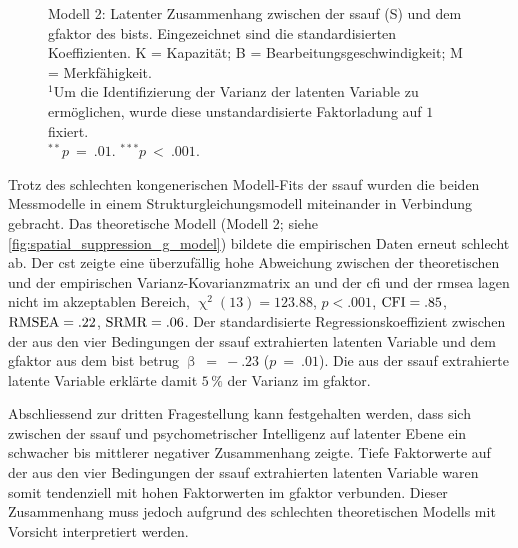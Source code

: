 \documentclass[11pt, twoside, a4paper]{book}		%
\begin{document}
\begin{figure}[htbp]
	
	\vspace{.2cm}
	\caption[Modell 2: Strukturgleichungsmodell zur Vorhersage des \gls{gfaktor}s durch die \gls{ssauf}]{Modell 2: Latenter Zusammenhang zwischen der \gls{ssauf} (\textsf{S}) und dem \gls{gfaktor} des \gls{bist}s. Eingezeichnet sind die standardisierten Koeffizienten. \textsf{K} = Kapazität; \textsf{B} = Bearbeitungsgeschwindigkeit; \textsf{M} = Merkfähigkeit.\\
	$^1$Um die Identifizierung der Varianz der latenten Variable zu ermöglichen, wurde diese unstandardisierte Faktorladung auf $1$ fixiert.\\
	$^{**}p~=~.01$. $^{***}p~<~.001$.}
	\label{fig:spatial_suppression_g_model}
\end{figure} 

Trotz des schlechten kongenerischen Modell-Fits der \gls{ssauf} wurden die beiden Messmodelle in einem Strukturgleichungsmodell miteinander in Verbindung gebracht. Das theoretische Modell (Modell 2; siehe \autoref{fig:spatial_suppression_g_model}) bildete die empirischen Daten erneut schlecht ab.  Der \gls{cst} zeigte eine überzufällig hohe Abweichung zwischen der theoretischen und der empirischen Var\-ianz-Ko\-var\-ianz\-ma\-trix an und der \gls{cfi} und der \gls{rmsea} lagen nicht im akzeptablen Bereich, $\upchi^2(13)=123.88$, $p<.001$, $\textnormal{CFI}=.85$, $\textnormal{RMSEA}=.22$, $\textnormal{SRMR}=.06$. 
Der standardisierte Regressionskoeffizient zwischen der aus den vier Bedingungen der \gls{ssauf} extrahierten latenten Variable und dem \gls{gfaktor} aus dem \gls{bist} betrug $\upbeta~=~-.23$ ($p~=~.01$).
Die aus der \gls{ssauf} extrahierte latente Variable erklärte damit $5\,\%$ der Varianz im \gls{gfaktor}.

Abschliessend zur dritten Fragestellung kann festgehalten werden, dass sich zwischen der \gls{ssauf} und psychometrischer Intelligenz auf latenter Ebene ein schwacher bis mittlerer negativer Zusammenhang zeigte.
Tiefe Faktorwerte auf der aus den vier Bedingungen der \gls{ssauf} extrahierten latenten Variable waren somit tendenziell mit hohen Faktorwerten im \gls{gfaktor} verbunden. Dieser Zusammenhang muss jedoch aufgrund des schlechten theoretischen Modells  mit Vorsicht interpretiert werden.
\end{document}
